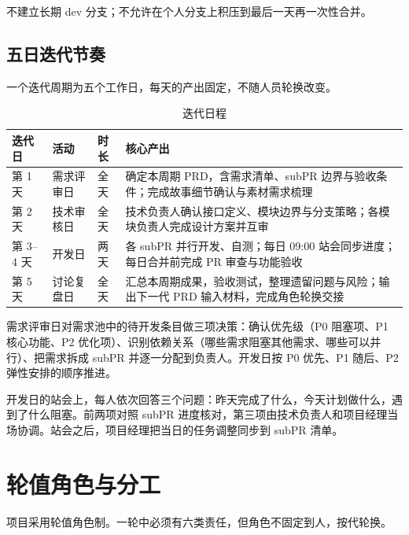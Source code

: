 不建立长期 dev 分支；不允许在个人分支上积压到最后一天再一次性合并。

\subsection{五日迭代节奏}

一个迭代周期为五个工作日，每天的产出固定，不随人员轮换改变。

\begin{table}[htbp]
\centering
\caption{迭代日程}
\small
\begin{tabularx}{\linewidth}{@{}l l l X@{}}
\toprule
迭代日 & 活动 & 时长 & 核心产出 \\
\midrule
第 1 天 & 需求评审日 & 全天 & 确定本周期 PRD，含需求清单、subPR 边界与验收条件；完成故事细节确认与素材需求梳理 \\
第 2 天 & 技术审核日 & 全天 & 技术负责人确认接口定义、模块边界与分支策略；各模块负责人完成设计方案并互审 \\
第 3--4 天 & 开发日 & 两天 & 各 subPR 并行开发、自测；每日 09:00 站会同步进度；每日合并前完成 PR 审查与功能验收 \\
第 5 天 & 讨论复盘日 & 全天 & 汇总本周期成果，验收测试，整理遗留问题与风险；输出下一代 PRD 输入材料，完成角色轮换交接 \\
\bottomrule
\end{tabularx}
\end{table}

需求评审日对需求池中的待开发条目做三项决策：确认优先级（P0 阻塞项、P1 核心功能、P2 优化项）、识别依赖关系（哪些需求阻塞其他需求、哪些可以并行）、把需求拆成 subPR 并逐一分配到负责人。开发日按 P0 优先、P1 随后、P2 弹性安排的顺序推进。

开发日的站会上，每人依次回答三个问题：昨天完成了什么，今天计划做什么，遇到了什么阻塞。前两项对照 subPR 进度核对，第三项由技术负责人和项目经理当场协调。站会之后，项目经理把当日的任务调整同步到 subPR 清单。

\section{轮值角色与分工}

项目采用轮值角色制。一轮中必须有六类责任，但角色不固定到人，按代轮换。

